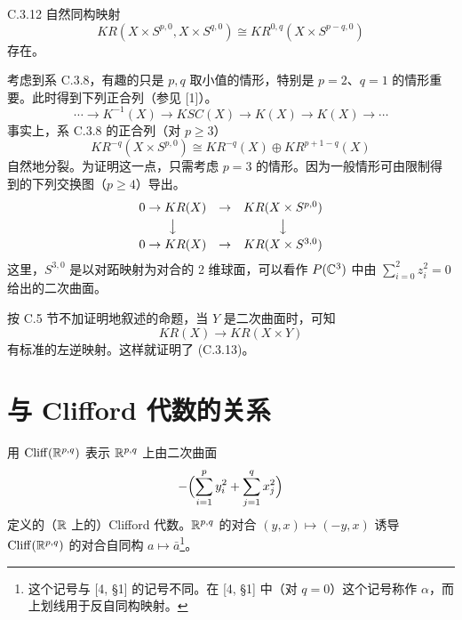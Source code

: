 \begin{corollary*}{C.3.12}
  自然同构映射
  \[
    KR(X\times S^{p,0},X\times S^{q,0})\cong KR^{0,q}(X\times S^{p-q,0})
  \]
  存在。
\end{corollary*}

考虑到系 C.3.8，有趣的只是 $p,q$ 取小值的情形，特别是 $p=2$、$q=1$ 的情形重要。此时得到下列正合列（参见 [1]）。
\[
  \cdots\to K^{-1}(X)\to KSC(X)\to K(X)\to K(X)\to\cdots
\]
事实上，系 C.3.8 的正合列（对 $p\ge 3$）
\begin{equation}
  KR^{-q}(X\times S^{p,0})\cong KR^{-q}(X)\oplus KR^{p+1-q}(X) \tag{C.3.13}
\end{equation}
自然地分裂。为证明这一点，只需考虑 $p=3$ 的情形。因为一般情形可由限制得到的下列交换图（$p\ge 4$）导出。
\[
\begin{array}{ccc}
  0\to KR(X) & \to & KR(X\times S^{p,0})\\[1mm]
  \big\downarrow & & \big\downarrow\\[1mm]
  0\to KR(X) & \to & KR(X\times S^{3,0})
\end{array}
\]
这里，$S^{3,0}$ 是以对跖映射为对合的 2 维球面，可以看作 $P(\mathbb{C}^3)$ 中由 $\sum_{i=0}^2 z_i^2=0$ 给出的二次曲面。


按 C.5 节不加证明地叙述的命题，当 $Y$ 是二次曲面时，可知
\[
  KR(X)\to KR(X\times Y)
\]
有标准的左逆映射。这样就证明了 (C.3.13)。

\section{与 Clifford 代数的关系}


用 $\operatorname{Cliff}(\mathbb{R}^{p,q})$ 表示 $\mathbb{R}^{p,q}$ 上由二次曲面
\[
  -\Bigl(\sum_{i=1}^p y_i^2+\sum_{j=1}^q x_j^2\Bigr)
\]
定义的（$\mathbb{R}$ 上的）Clifford 代数。$\mathbb{R}^{p,q}$ 的对合 $(y,x)\mapsto(-y,x)$ 诱导 $\operatorname{Cliff}(\mathbb{R}^{p,q})$ 的对合自同构 $a\mapsto\bar a$\footnote{这个记号与 [4, §1] 的记号不同。在 [4, §1] 中（对 $q=0$）这个记号称作 $\alpha$，而上划线用于反自同构映射。}。

